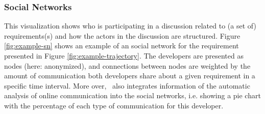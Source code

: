 \subsubsection{Social Networks} 
This visualization shows who is participating in a discussion related to (a set of) requirements(s) and how the actors in the discussion are structured. 
Figure \ref{fig:example-sn} shows an example of an social network for the requirement presented in Figure \ref{fig:example-trajectory}. 
The developers are presented as nodes (here: anonymized), and connections between nodes are weighted by the amount of communication both developers share about a given requirement in a specific time interval. 
More over, \viss\ also integrates information of the automatic analysis of online communication into the social networks, i.e. showing a pie chart with the percentage of each type of communication for this developer.

